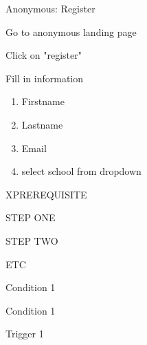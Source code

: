 \begin{uc}{Anonymous: Register}

    \begin{uc-mss}
   	\item Go to anonymous landing page
   	\item Click on "register"
   	\item Fill in information
   	\begin{enumerate}
   	\item Firstname
   	\item Lastname
   	\item Email
   	\item select school from dropdown
   	\end{enumerate}
    \end{uc-mss}

    \begin{uc-ext}

        \begin{uc-fail}{X}{PREREQUISITE}
        \item STEP ONE
        \item STEP TWO
        \item ETC
        \end{uc-fail}

        \begin{uc-pre}
        \item Condition 1
        \end{uc-pre}

        \begin{uc-post}
        \item Condition 1
        \end{uc-post}

        \begin{uc-trig}
        \item Trigger 1
        \end{uc-trig}

    \end{uc-ext}

\end{uc}


